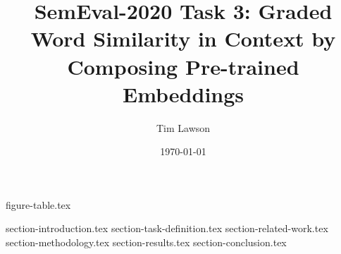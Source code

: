 \documentclass[11pt]{extarticle}
\begin{document}
\title{SemEval-2020 Task 3: Graded Word Similarity in Context by Composing Pre-trained Embeddings}
\author{Tim Lawson}
\date{\today}

\maketitle

{figure-table.tex}

{section-introduction.tex}
{section-task-definition.tex}
{section-related-work.tex}
{section-methodology.tex}
{section-results.tex}
{section-conclusion.tex}

\printbibliography
\end{document}
